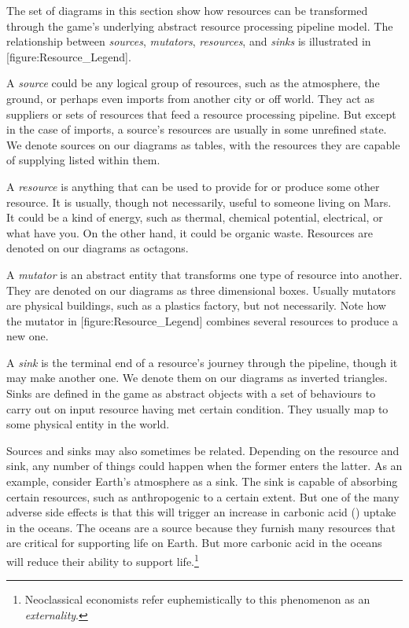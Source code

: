 
The set of diagrams in this section show how resources can be transformed through the game's underlying abstract resource processing pipeline model. The relationship between {\it sources}, {\it mutators}, {\it resources}, and {\it sinks} is illustrated in [figure:Resource_Legend].

    {}

A {\it source} could be any logical group of resources, such as the atmosphere, the ground, or perhaps even imports from another city or off world.  They act as suppliers or sets of resources that feed a resource processing pipeline. But except in the case of imports, a source's resources are usually in some unrefined state. We denote sources on our diagrams as tables, with the resources they are capable of supplying listed within them.

A {\it resource} is anything that can be used to provide for or produce some other resource. It is usually, though not necessarily, useful to someone living on Mars. It could be a kind of energy, such as thermal, chemical potential, electrical, or what have you. On the other hand, it could be organic waste. Resources are denoted on our diagrams as octagons.

A {\it mutator} is an abstract entity that transforms one type of resource into another. They are denoted on our diagrams as three dimensional boxes. Usually mutators are physical buildings, such as a plastics factory, but not necessarily. Note how the mutator in [figure:Resource_Legend] combines several resources to produce a new one.

A {\it sink} is the terminal end of a resource's journey through the pipeline, though it may make another one. We denote them on our diagrams as inverted triangles. Sinks are defined in the game as abstract objects with a set of behaviours to carry out on input resource having met certain condition. They usually map to some physical entity in the world. 

Sources and sinks may also sometimes be related. Depending on the resource and sink, any number of things could happen when the former enters the latter. As an example, consider Earth's atmosphere as a sink. The sink is capable of absorbing certain resources, such as anthropogenic  to a certain extent. But one of the many adverse side effects is that this will trigger an increase in carbonic acid () uptake in the oceans. The oceans are a source because they furnish many resources that are critical for supporting life on Earth. But more carbonic acid in the oceans will reduce their ability to support life.\footnote{Neoclassical economists refer euphemistically to this phenomenon as an {\it externality}.} 

